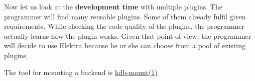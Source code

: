Now let us look at the {\bfseries development time} with multiple plugins. The programmer will find many reusable plugins. Some of them already fulfil given requirements. While checking the code quality of the plugins, the programmer actually learns how the plugin works. Given that point of view, the programmer will decide to use Elektra because he or she can choose from a pool of existing plugins.


\begin{DoxyItemize}
\item The tool for mounting a backend is \hyperlink{doc_help_kdb-mount_md}{kdb-\/mount(1)} 
\end{DoxyItemize}